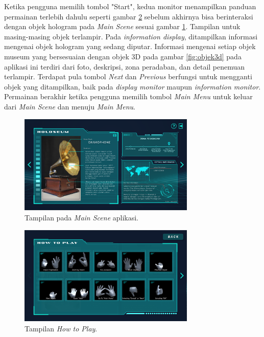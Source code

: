 		Ketika pengguna memilih tombol "Start", kedua monitor menampilkan panduan permainan terlebih dahulu seperti gambar \ref{fig:sb_htp} sebelum akhirnya bisa berinteraksi dengan objek hologram pada \textit{Main Scene} sesuai gambar \ref{fig:mainscene_utama}. Tampilan untuk masing-masing objek terlampir. Pada \textit{information display}, ditampilkan informasi mengenai objek hologram yang sedang diputar. Informasi mengenai setiap objek museum yang bersesuaian dengan objek 3D pada gambar \ref{fig:objek3d} pada aplikasi ini terdiri dari foto, deskripsi, zona peradaban, dan detail penemuan terlampir. Terdapat pula tombol \textit{Next} dan \textit{Previous} berfungsi untuk mengganti objek yang ditampilkan, baik pada \textit{display monitor} maupun \textit{information monitor}. Permainan berakhir ketika pengguna memilih tombol \textit{Main Menu} untuk keluar dari \textit{Main Scene} dan menuju \textit{Main Menu}.
		\vspace{-2ex}
		\begin{figure} [H]
			\includegraphics[width=0.75\textwidth]{img/bab3/ui/mainscene.png}
			\caption{Tampilan pada \textit{Main Scene} aplikasi.}
			\label{fig:mainscene_utama}
		\end{figure} 
		\vspace{-2ex}
		\begin{figure}[H]
			\includegraphics[width=0.75\textwidth]{img/bab3/ui/htp.png}
			\caption{Tampilan \textit{How to Play}.}
			\label{fig:sb_htp}
		\end{figure}
